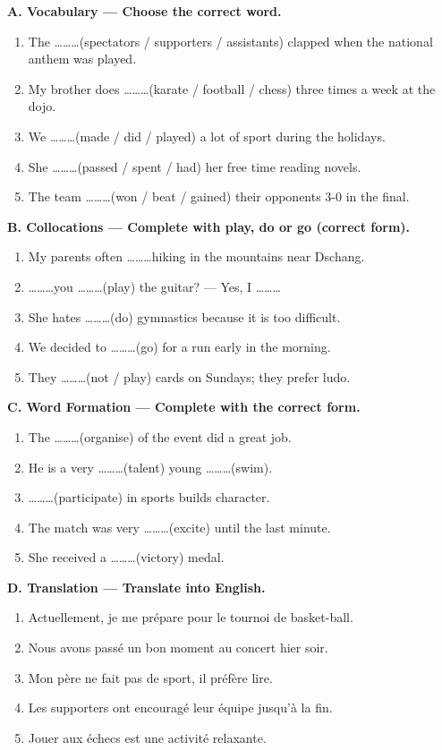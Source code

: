 \documentclass[11pt]{article}
\begin{document}
\begin{exercice}
\textbf{A. Vocabulary — Choose the correct word.}
\begin{enumerate}
\item The \ldots\ldots\ldots (spectators / supporters / assistants) clapped when the national anthem was played.
\item My brother does \ldots\ldots\ldots (karate / football / chess) three times a week at the dojo.
\item We \ldots\ldots\ldots (made / did / played) a lot of sport during the holidays.
\item She \ldots\ldots\ldots (passed / spent / had) her free time reading novels.
\item The team \ldots\ldots\ldots (won / beat / gained) their opponents 3-0 in the final.
\end{enumerate}

\textbf{B. Collocations — Complete with play, do or go (correct form).}
\begin{enumerate}
\item My parents often \ldots\ldots\ldots hiking in the mountains near Dschang.
\item \ldots\ldots\ldots you \ldots\ldots\ldots (play) the guitar? — Yes, I \ldots\ldots\ldots
\item She hates \ldots\ldots\ldots (do) gymnastics because it is too difficult.
\item We decided to \ldots\ldots\ldots (go) for a run early in the morning.
\item They \ldots\ldots\ldots (not / play) cards on Sundays; they prefer ludo.
\end{enumerate}

\textbf{C. Word Formation — Complete with the correct form.}
\begin{enumerate}
\item The \ldots\ldots\ldots (organise) of the event did a great job.
\item He is a very \ldots\ldots\ldots (talent) young \ldots\ldots\ldots (swim).
\item \ldots\ldots\ldots (participate) in sports builds character.
\item The match was very \ldots\ldots\ldots (excite) until the last minute.
\item She received a \ldots\ldots\ldots (victory) medal.
\end{enumerate}

\textbf{D. Translation — Translate into English.}
\begin{enumerate}
\item Actuellement, je me prépare pour le tournoi de basket-ball.
\item Nous avons passé un bon moment au concert hier soir.
\item Mon père ne fait pas de sport, il préfère lire.
\item Les supporters ont encouragé leur équipe jusqu'à la fin.
\item Jouer aux échecs est une activité relaxante.
\end{enumerate}


\end{exercice}
\end{document}
